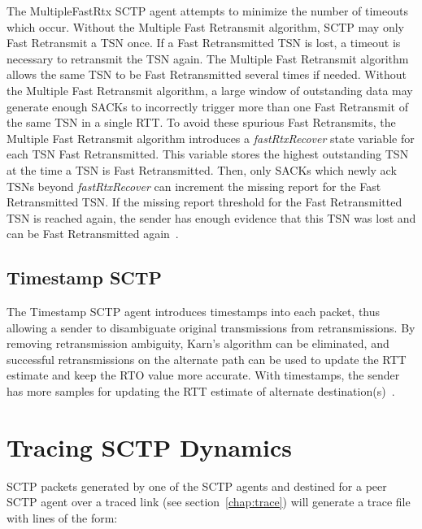 	 The MultipleFastRtx SCTP agent attempts to minimize the number of
	 timeouts which occur. Without the Multiple Fast Retransmit
	 algorithm, SCTP may only Fast Retransmit a TSN once. If a Fast
	 Retransmitted TSN is lost, a timeout is necessary to retransmit
	 the TSN again. The Multiple Fast Retransmit algorithm allows the
	 same TSN to be Fast Retransmitted several times if
	 needed. Without the Multiple Fast Retransmit algorithm, a large
	 window of outstanding data may generate enough SACKs to
	 incorrectly trigger more than one Fast Retransmit of the same TSN
	 in a single RTT.  To avoid these spurious Fast Retransmits, the
	 Multiple Fast Retransmit algorithm introduces a {\em
	 fastRtxRecover} state variable for each TSN Fast
	 Retransmitted. This variable stores the highest outstanding TSN
	 at the time a TSN is Fast Retransmitted. Then, only SACKs which
	 newly ack TSNs beyond {\em fastRtxRecover} can increment the
	 missing report for the Fast Retransmitted TSN. If the missing
	 report threshold for the Fast Retransmitted TSN is reached again,
	 the sender has enough evidence that this TSN was lost and can be
	 Fast Retransmitted again~\cite{SCTP_CARO_2003e}.

      \subsection{Timestamp SCTP}

	 The Timestamp SCTP agent introduces timestamps into each packet,
	 thus allowing a sender to disambiguate original transmissions
	 from retransmissions. By removing retransmission ambiguity,
	 Karn's algorithm can be eliminated, and successful
	 retransmissions on the alternate path can be used to update the
	 RTT estimate and keep the RTO value more accurate. With
	 timestamps, the sender has more samples for updating the RTT
	 estimate of alternate destination(s)~\cite{SCTP_CARO_2003e}.

   \section{Tracing SCTP Dynamics}
   \label{sec:sctpTracing}

      SCTP packets generated by one of the SCTP agents and destined for a
      peer SCTP agent over a traced link (see section~\ref{chap:trace})
      will generate a trace file with lines of the form:

